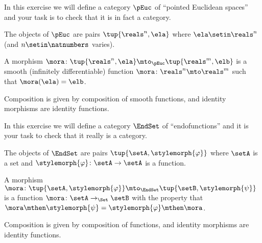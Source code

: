 
    
\begin{gradedexercise}
\label{ex:pointed-euclidean-spaces}

In this exercise we will define a category $\pEuc$ of ``pointed Euclidean spaces'' and your task is to check that it is in fact a category. 

The objects of $\pEuc$ are pairs $\tup{\reals^n, \ela}$ where $\ela \setin \reals^n$ (and $n \setin \natnumbers$ varies).  

A morphism $\mora \colon \tup{\reals^n, \ela} \mto_{\pEuc} \tup{\reals^m, \elb}$ is a smooth (infinitely differentiable) function $\mora \colon \reals^n \mto \reals^m$ such that $\mora(\ela) = \elb$. 

Composition is given by composition of smooth functions, and identity morphisms are identity functions. 
    
\end{gradedexercise}


\begin{gradedexercise}
\label{ex:endofunctions}

In this exercise we will define a category $\EndSet$ of ``endofunctions'' and it is your task to check that it really is a category. 

The objects of $\EndSet$ are pairs $\tup{\setA, \stylemorph{\varphi}}$ where $\setA$ is a set and $\stylemorph{\varphi} \colon \setA \to \setA$ is a function.  

A morphism $\mora \colon \tup{\setA, \stylemorph{\varphi}} \mto_\EndSet \tup{\setB, \stylemorph{\psi}}$ is a function $\mora \colon \setA \to_\Set \setB$ with the property that $\mora \mthen \stylemorph{\psi}= \stylemorph{\varphi} \mthen \mora$. 

Composition is given by composition of functions, and identity morphisms are identity functions.
        
\end{gradedexercise}


